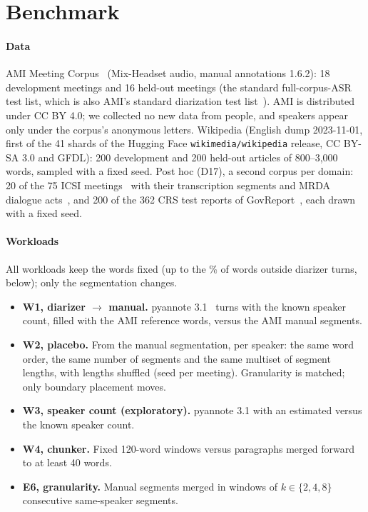 \documentclass[conference]{IEEEtran}
\begin{document}
\section{Benchmark}\label{sec:bench}
\paragraph*{Data}
AMI Meeting Corpus~\cite{ami} (Mix-Headset audio, manual annotations 1.6.2): 18 development meetings and 16 held-out
meetings (the standard full-corpus-ASR test list, which is also AMI's standard diarization test list~\cite{amisetup}).
AMI is distributed under CC BY 4.0; we collected no new data from people, and speakers appear only under the
corpus's anonymous letters. Wikipedia (English dump 2023-11-01, first of the 41 shards of the Hugging Face
\texttt{wikimedia/wikipedia} release, CC BY-SA 3.0 and GFDL): 200 development and 200 held-out articles of
800--3,000 words, sampled with a fixed seed. Post hoc (D17), a second corpus per domain: 20 of the 75 ICSI
meetings~\cite{icsi} with their transcription segments and MRDA dialogue acts~\cite{mrda}, and 200 of the 362 CRS
test reports of GovReport~\cite{govreport}, each drawn with a fixed seed.
\paragraph*{Workloads} All workloads keep the words fixed (up to the \nDropWone\% of words outside diarizer turns, below);
only the segmentation changes.
\begin{itemize}[leftmargin=*,nosep]
\item \textbf{W1, diarizer $\to$ manual.} pyannote 3.1~\cite{pyannote} turns with the known speaker count, filled with
the AMI reference words, versus the AMI manual segments.
\item \textbf{W2, placebo.} From the manual segmentation, per speaker: the same word order, the same number of segments
and the same multiset of segment lengths, with lengths shuffled (seed per meeting). Granularity is matched; only
boundary placement moves.
\item \textbf{W3, speaker count (exploratory).} pyannote 3.1 with an estimated versus the known speaker count.
\item \textbf{W4, chunker.} Fixed 120-word windows versus paragraphs merged forward to at least 40 words.
\item \textbf{E6, granularity.} Manual segments merged in windows of $k\in\{2,4,8\}$ consecutive same-speaker segments.
\end{itemize}
\end{document}
